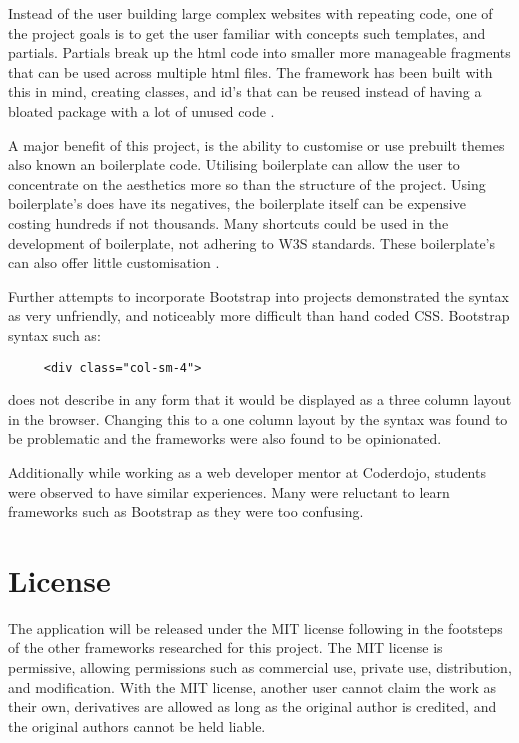 Instead of the user building large complex websites with repeating code, one of the project goals is to get the user familiar with concepts such templates, and partials. Partials break up the html code into smaller more manageable fragments that can be used across multiple html files. The framework has been built with this in mind, creating classes, and id's that can be reused instead of having a bloated package with a lot of unused code \citep{KAR15}.

A major benefit of this project, is the ability to customise or use prebuilt themes also known an boilerplate code. Utilising boilerplate can allow the user to concentrate on the aesthetics more so than the structure of the project. Using boilerplate's does have its negatives, the boilerplate itself can be expensive costing hundreds if not thousands. Many shortcuts could be used in the development of boilerplate, not adhering to W3S standards. These boilerplate's can also offer little customisation \citep{NATH16}.

Further attempts to incorporate Bootstrap into projects demonstrated the syntax as very unfriendly, and noticeably more difficult than hand coded \gls{CSS}. Bootstrap syntax such as: \begin{lstlisting}
	 <div class="col-sm-4">\end{lstlisting} 
	 does not describe in any form that it would be displayed as a three column layout in the browser. Changing this to a one column layout by the syntax was found to be problematic and the frameworks were also found to be opinionated.  
	 
Additionally while working as a web developer mentor at Coderdojo, students were observed to have similar experiences. Many were reluctant to learn frameworks such as Bootstrap as they were too confusing.

%
\section*{License}
The application will be released under the MIT license following in the footsteps of the other frameworks researched for this project. The MIT license is permissive, allowing permissions such as commercial use, private use, distribution, and modification. With the MIT license, another user cannot claim the work as their own, derivatives are allowed as long as the original author is credited, and the original authors cannot be held liable.


